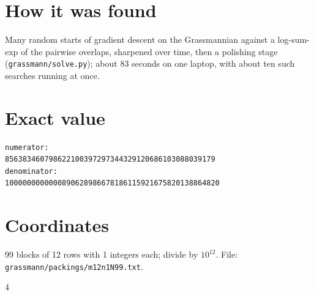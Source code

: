 \documentclass[11pt,a4paper]{article}
\begin{document}
\section{How it was found}
Many random starts of gradient descent on the Grassmannian against a log-sum-exp of the pairwise overlaps, sharpened over time, then a polishing stage (\texttt{grassmann/solve.py}); about 83 seconds on one laptop, with about ten such searches running at once.


\appendix
\section{Exact value}
{\small
\begin{verbatim}
numerator:
856383460798622100397297344329120686103088039179
denominator:
1000000000000890628986678186115921675820138864820
\end{verbatim}}

\section{Coordinates}
99 blocks of 12 rows with 1 integers each; divide by $10^{12}$. File: \texttt{grassmann/packings/m12n1N99.txt}.
{\tiny
\begin{multicols}{4}
\end{multicols}}
\end{document}
